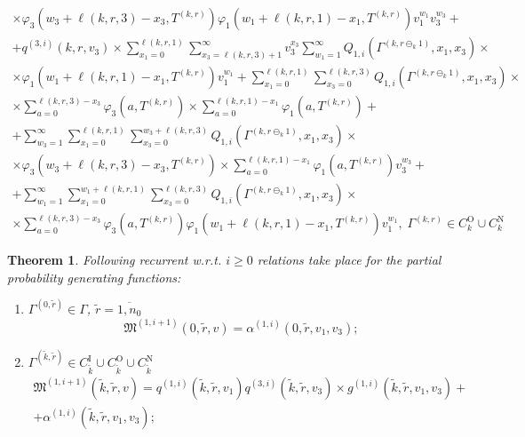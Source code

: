 \documentclass[60x84/16,10pt]{dccn}
\newtheorem{theorem}{Theorem}[section]
\begin{document}
{\begin{gather*}
   \times \varphi_3(w_3 + \ell(k,r,3) - x_3,T^{(k,r)})   \varphi_1(w_1 + \ell(k,r,1) - x_1,T^{(k,r)})  v_1^{w_1} v_3^{w_3} + \\ + q^{(3,i)}(k,r,v_3) 
    \times  \sum_{x_1=0}^{\ell(k,r,1)}\sum_{x_3=\ell(k,r,3)+1}^{\infty}
    v_3^{x_3} \sum_{w_1=1}^{\infty}  Q_{1,i}(\Gamma^{(k,r\ominus_k 1)},x_1,
    x_3)\times \\ 
    \times \!\varphi_1(w_1 + \ell(k,r,1) - x_1,T^{(k,r)})v_1^{w_1} 
   +\!\!\!\sum_{x_1=0}^{\ell(k,r,1)} \sum_{x_3=0}^{\ell(k,r,3)} \!Q_{1,i}(\Gamma^{(k,r\ominus_k 1)},x_1, x_3)\!\times \\ \times
\sum_{a=0}^{\ell(k,r,3)-x_3}\varphi_3(a,T^{(k,r)}) \times \sum_{a=0}^{\ell(k,r,1)-x_1}\varphi_1(a,T^{(k,r)})
+ \\ + 
    \sum_{w_3=1}^{\infty} \sum_{x_1=0}^{\ell(k,r,1)} \sum_{x_3=0}^{w_3 + \ell(k,r,3)} Q_{1,i}(\Gamma^{(k,r\ominus_k 1)},x_1, x_3) \times  \\ \times \varphi_3(w_3 + \ell(k,r,3) - x_3,T^{(k,r)})  \times \sum_{a=0}^{\ell(k,r,1)-x_1}\varphi_1(a,T^{(k,r)})  v_3^{w_3} + \\
    +
    \sum_{w_1=1}^{\infty} \sum_{x_1=0}^{w_1 + \ell(k,r,1) } \sum_{x_3=0}^{\ell(k,r,3)} Q_{1,i}(\Gamma^{(k,r\ominus_k 1)},x_1, x_3) \times  \\ \times \!\sum_{a=0}^{\ell(k,r,3)-x_3}\!\!\varphi_3(a,T^{(k,r)})  \varphi_1(w_1 + \ell(k,r,1) - x_1,T^{(k,r)}) v_1^{w_1} 
     , \; \Gamma^{(k,r)}\! \in C_{k}^{\mathrm{O}} \!\cup\! C_{k}^{\mathrm{N}}
\end{gather*}


\begin{theorem}
Following recurrent w.r.t. $i
\geqslant 0$ relations take place for the  partial probability generating functions:
\begin{enumerate}

\item $ \Gamma^{(0,\tilde{r})} \in \Gamma$, $\tilde{r} = \overline{1,n_0}$ 
$$
\mathfrak{M}^{(1,i+1)}(0,\tilde{r},v) = \alpha^{(1,i)}(0,\tilde{r},v_1,v_3);
$$
\item $\Gamma^{(\tilde{k},\tilde{r})} \in C_{\tilde{k}}^{\mathrm{I}} \cup C_{\tilde{k}}^{\mathrm{O}} \cup C_{\tilde{k}}^{\mathrm{N}}$
\begin{multline*}
\mathfrak{M}^{(1,i+1)}(\tilde{k},\tilde{r},v) = q^{(1,i)}(\tilde{k},\tilde{r},v_1) q^{(3,i)}(\tilde{k},\tilde{r},v_3) \times g^{(1,i)}(\tilde{k},\tilde{r},v_1,v_3)
     +\\+ \alpha^{(1,i)}(\tilde{k},\tilde{r},v_1,v_3);
\end{multline*}
\end{enumerate}


\end{theorem}}
\end{document}
